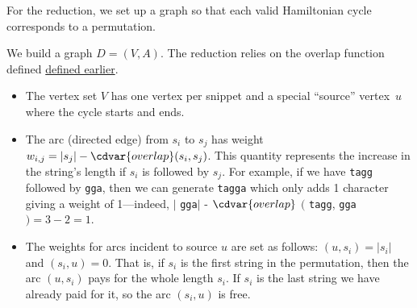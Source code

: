 \begin{cluster}
\label{grp:grm:genome::reduction-from-ss-to-tsp}

\begin{gram}
\label{grm:genome::reduction-from-ss-to-tsp}
For the reduction, we set up a graph so that each valid Hamiltonian cycle
corresponds to a permutation.  

We build a graph $D = (V, A)$.
The reduction relies on the overlap function defined
\href{def:genome::prob::overlap}{defined earlier}.

\begin{itemize}
\item The vertex set $V$ has one vertex per snippet and a special
  ``source'' vertex~$u$ where the cycle starts and ends.

\item The arc (directed edge) from $s_i $ to $s_j$ has weight $w_{i,j}
  = |s_j| - \cdvar{overlap}(s_i, s_j)$. 
 This quantity represents the increase
  in the string's length if $s_i$ is followed by $s_j$. 
  For example, if we have \texttt{tagg} followed by
  \texttt{gga}, then we can generate \texttt{tagga} which only
  adds 1 character giving a weight of 1---indeed,
  $|$ \texttt{gga}$|$ -
  $\cdvar{overlap}$ $($ \texttt{tagg}, \texttt{gga} $) = 3 -
  2 = 1$.

\item The weights for arcs incident to source $u$ are set as follows:
  $(u, s_i) = |s_i|$ and $(s_i, u) = 0$.  That is, if
  $s_i$ is the first string in the permutation, then the arc
  $(u, s_i)$ pays for the whole length $s_i$.  If $s_i$ is the
  last string we have already paid for it, so the arc $(s_i, u)$
  is free.
\end{itemize}

\end{gram}
\end{cluster}

